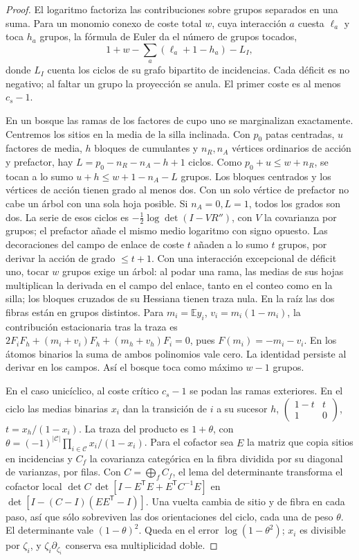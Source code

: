 \begin{proof}
El logaritmo factoriza las contribuciones sobre grupos separados en una suma. Para un
monomio conexo de coste total \(w\), cuya interacción \(a\) cuesta \(\ell_a\) y toca
\(h_a\) grupos, la fórmula de Euler da el número de grupos tocados,
\[
 1+w-\sum_a(\ell_a+1-h_a)-L_I ,
\]
donde \(L_I\) cuenta los ciclos de su grafo bipartito de incidencias. Cada déficit es
no negativo; al faltar un grupo la proyección se anula. El primer coste es al menos \(c_s-1\).

En un bosque las ramas de los factores de cupo uno se marginalizan exactamente. Centremos
los sitios en la media de la silla inclinada. Con \(p_0\) patas centradas, \(u\) factores
de media, \(h\) bloques de cumulantes y \(n_R,n_A\) vértices ordinarios de acción y
prefactor, hay \(L=p_0-n_R-n_A-h+1\) ciclos. Como \(p_0+u\le w+n_R\), se tocan
a lo sumo \(u+h\le w+1-n_A-L\) grupos. Los bloques centrados y los vértices de acción
tienen grado al menos dos. Con un solo vértice de prefactor no cabe un árbol con una
sola hoja posible. Si \(n_A=0,L=1\), todos los grados son dos. La serie de esos ciclos
es \(-\tfrac12\log\det(I-VR'')\), con \(V\) la covarianza por grupos; el prefactor
añade el mismo medio logaritmo con signo opuesto. Las decoraciones del campo de enlace
de coste \(t\) añaden a lo sumo \(t\) grupos, por derivar la acción de grado \(\le t+1\).
Con una interacción excepcional de déficit uno, tocar \(w\) grupos exige un árbol:
al podar una rama, las medias de sus hojas multiplican la derivada en el campo del
enlace, tanto en el conteo como en la silla; los bloques cruzados de su Hessiana tienen
traza nula. En la raíz las dos fibras están en grupos distintos. Para \(m_i=\mathbb Ey_i\),
\(v_i=m_i(1-m_i)\), la contribución estacionaria tras la traza es
\(2F_iF_h+(m_i+v_i)F_h+(m_h+v_h)F_i=0\), pues \(F(m_i)=-m_i-v_i\).
En los átomos binarios la suma de ambos polinomios vale cero. La identidad persiste al
derivar en los campos. Así el bosque toca como máximo \(w-1\) grupos.

En el caso unicíclico, al coste crítico \(c_s-1\) se podan las ramas exteriores. En el
ciclo las medias binarias \(x_i\) dan la transición de \(i\) a su sucesor \(h\),
\(\left(\begin{smallmatrix}1-t&t\\1&0\end{smallmatrix}\right)\), \(t=x_h/(1-x_i)\).
La traza del producto es \(1+\theta\), con
\(\theta=(-1)^{|\mathcal C|}\prod_{i\in\mathcal C}x_i/(1-x_i)\).
Para el cofactor sea \(E\) la matriz que copia sitios en incidencias y \(C_f\) la
covarianza categórica en la fibra dividida por su diagonal de varianzas, por filas.
Con \(C=\bigoplus_f C_f\), el lema del determinante transforma el cofactor local
\(\det C\,\det[I-E^{\mathsf T}E+E^{\mathsf T}C^{-1}E]\) en
\(\det[I-(C-I)(EE^{\mathsf T}-I)]\). Una vuelta cambia de sitio y de fibra en
cada paso, así que sólo sobreviven las dos orientaciones del ciclo, cada una de peso
\(\theta\). El determinante vale \((1-\theta)^2\). Queda en el error
\(\log(1-\theta^2)\); \(x_i\) es divisible por \(\zeta_i\), y
\(\zeta_i\partial_{\zeta_i}\) conserva esa multiplicidad doble.


\end{proof}
